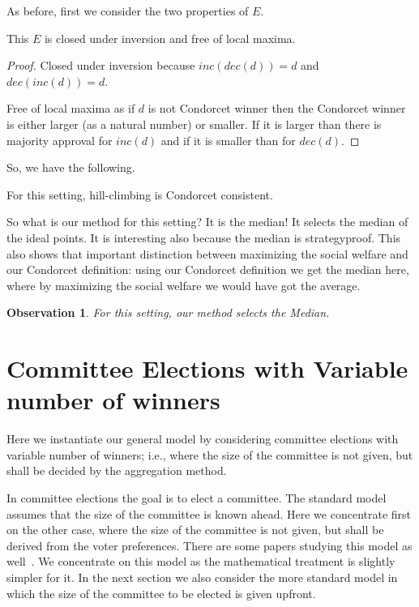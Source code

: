 \documentclass[sigconf]{aamas}  %
\newtheorem{observation}{Observation}
\begin{document}
As before, first we consider the two properties of $E$.

\begin{lemma}
  This $E$ is closed under inversion and free of local maxima.
\end{lemma}

\begin{proof}
%
Closed under inversion because $inc(dec(d)) = d$ and $dec(inc(d)) = d$.

Free of local maxima as if $d$ is not Condorcet winner then the Condorcet winner is either larger (as a natural number) or smaller. If it is larger than there is majority approval for $inc(d)$ and if it is smaller than for $dec(d)$.
%
\end{proof}

So, we have the following.

\begin{corollary}
  For this setting, hill-climbing is Condorcet consistent.
\end{corollary}

So what is our method for this setting? It is the median! It selects the median of the ideal points.
It is interesting also because the median is strategyproof.
This also shows that important distinction between maximizing the social welfare and our Condorcet definition:
  using our Condorcet definition we get the median here, where by maximizing the social welfare we would have got the average.

\begin{observation}
  For this setting, our method selects the Median.
\end{observation}


\section{Committee Elections with Variable number of winners}
\label{section:commiteee election}

Here we instantiate our general model by considering committee elections with variable number of winners; i.e., where the size of the committee is not given, but shall be decided by the aggregation method.

In committee elections the goal is to elect a committee. The standard model assumes that the size of the committee is known ahead.
Here we concentrate first on the other case, where the size of the committee is not given, but shall be derived from the voter preferences. There are some papers studying this model as well~\cite{kilgourvnw,vnw}.
We concentrate on this model as the mathematical treatment is slightly simpler for it. In the next section we also consider the more standard model in which the size of the committee to be elected is given upfront.
\end{document}
